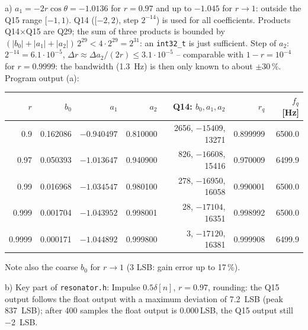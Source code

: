 \begin{solution}
a) $a_1=-2r\cos\theta=-1.0136$ for $r=0.97$ and up to $-1.045$ for $r\to1$:
outside the Q15 range $[-1,1)$. Q14 ($[-2,2)$, step $2^{-14}$) is used for all
coefficients. Products Q14$\times$Q15 are Q29; the sum of three products is
bounded by $(|b_0|+|a_1|+|a_2|)\,2^{29}<4\cdot2^{29}=2^{31}$: an
\texttt{int32\_t} is just sufficient. Step of $a_2$: $2^{-14}=6.1\cdot10^{-5}$,
$\Delta r\approx\Delta a_2/(2r)\le3.1\cdot10^{-5}$ -- comparable with
$1-r=10^{-4}$ for $r=0.9999$: the bandwidth (\SI{1.3}{Hz}) is then only
known to about $\pm30\,\%$. Program output (a):
\begin{center}\small
\begin{tabular}{rrrrrrr}
\toprule
$r$ & $b_0$ & $a_1$ & $a_2$ & Q14: $b_0,a_1,a_2$ & $r_q$ & $f_q$ [Hz]\\
\midrule
0.9 & 0.162086 & $-0.940497$ & 0.810000 & 2656, $-15409$, 13271 & 0.899999 & 6500.0\\
0.97 & 0.050393 & $-1.013647$ & 0.940900 & 826, $-16608$, 15416 & 0.970009 & 6499.9\\
0.99 & 0.016968 & $-1.034547$ & 0.980100 & 278, $-16950$, 16058 & 0.990001 & 6500.0\\
0.999 & 0.001704 & $-1.043952$ & 0.998001 & 28, $-17104$, 16351 & 0.998992 & 6500.0\\
0.9999 & 0.000171 & $-1.044892$ & 0.999800 & 3, $-17120$, 16381 & 0.999908 & 6499.9\\
\bottomrule
\end{tabular}
\end{center}
Note also the coarse $b_0$ for $r\to1$ (3 LSB: gain error up to 17\,\%).

b) Key part of \texttt{resonator.h}:
Impulse $0.5\delta[n]$, $r=0.97$, rounding: the Q15 output follows the float
output with a maximum deviation of \SI{7.2}{LSB} (peak \SI{837}{LSB}); after
400 samples the float output is $0.000$\,LSB, the Q15 output still
\SI{-2}{LSB}.


\end{solution}
